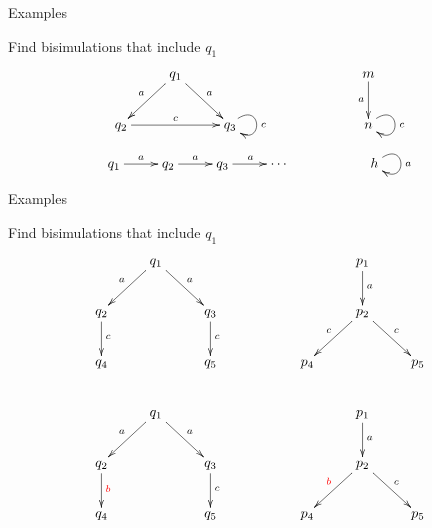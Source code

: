 \documentclass[aspectratio=169]{beamer}
\begin{document}
\begin{slide}{Examples}

\begin{exampleblock}{\exercise Find bisimulations that include $q_1$}
\begin{equation*}
\xymatrix{
& q_1  \ar[ld]_{a}  \ar[rd]^{a} & & & & m \ar[d]_{a}\\
q_2 \ar[rr]^{c}  && q_3 \ar@(ur,dr)[]^{c}  & & & n\ar@(ur,dr)[]^{c}
}
\end{equation*}
\vspace{1cm}

\begin{equation*}
\xymatrix{
q_1 \ar[r]^{a} & q_2  \ar[r]^{a}  & q_3  \ar[r]^{a} & \cdots & & h\ar@(ur,dr)[]^{a}  \\
}
\end{equation*}
\end{exampleblock}

\end{slide}


\begin{slide}{Examples}

\begin{exampleblock}{\exercise Find bisimulations that include $q_1$}
\vspace*{-3mm}
\begin{equation*}
\xymatrix{
& q_1  \ar[ld]_{a}  \ar[rd]^{a} & & & & p_1  \ar[d]^{a} \\
q_2 \ar[d]^{c}  && q_3  \ar[d]^{c}  & && p_2  \ar[ld]_{c}  \ar[rd]^{c} & \\
q_4 & & q_5 & &p_4 & & p_5\\
& q_1  \ar[ld]_{a}  \ar[rd]^{a} & & & & p_1  \ar[d]^{a} \\
q_2 \ar[d]^{\rdb{b}}  && q_3  \ar[d]^{c}  & && p_2  \ar[ld]_{\rdb{b}}  \ar[rd]^{c} & \\
q_4 & & q_5 & &p_4 & & p_5
}
\end{equation*}
\end{exampleblock}
\end{slide}
\end{document}
